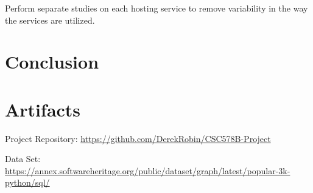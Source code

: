 \documentclass[acmconf]{acmart}
\begin{document}
Perform separate studies on each hosting service to remove variability in the way the services are utilized.

\section{Conclusion} \label{conclusion}




\appendix

\section{Artifacts} \label{artifacts}
Project Repository: \url{https://github.com/DerekRobin/CSC578B-Project}

Data Set: \url{https://annex.softwareheritage.org/public/dataset/graph/latest/popular-3k-python/sql/}
\end{document}
